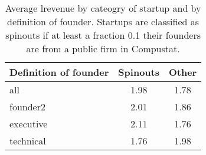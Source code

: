 \begin{table}[!htb]
\centering
\begingroup\small
\begin{tabular}{p{1.5cm}cc}
  \toprule
Definition of founder & Spinouts & Other \\ 
  \midrule
all & 1.98 & 1.78 \\ 
  founder2 & 2.01 & 1.86 \\ 
  executive & 2.11 & 1.76 \\ 
  technical & 1.76 & 1.98 \\ 
   \bottomrule
\end{tabular}
\endgroup
\caption{Average lrevenue by cateogry of startup and by definition of founder. Startups are classified as spinouts if at least a fraction 0.1 their founders are from a public firm in Compustat.} 
\label{table:raw_comparison_lrevenue}
\end{table}
